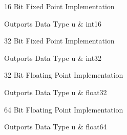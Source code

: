 \ifdefined \AddTestReports
{}
\fi
{}
\nopagebreak[0]

16 Bit Fixed Point Implementation

\begin{XtoCtabular}{Outports Data Type}
u & int16\tabularnewline
\hline
\end{XtoCtabular}

\ifdefined \AddTestReports
{}
\fi
{}
\nopagebreak[0]

32 Bit Fixed Point Implementation

\begin{XtoCtabular}{Outports Data Type}
u & int32\tabularnewline
\hline
\end{XtoCtabular}

\ifdefined \AddTestReports
{}
\fi
{}
\nopagebreak[0]

32 Bit Floating Point Implementation

\begin{XtoCtabular}{Outports Data Type}
u & float32\tabularnewline
\hline
\end{XtoCtabular}

\ifdefined \AddTestReports
{}
\fi
{}
\nopagebreak[0]

64 Bit Floating Point Implementation

\begin{XtoCtabular}{Outports Data Type}
u & float64\tabularnewline
\hline
\end{XtoCtabular}

\ifdefined \AddTestReports
{}
\fi
